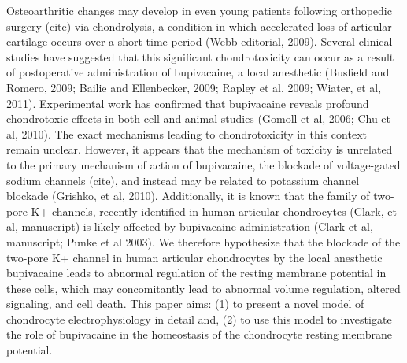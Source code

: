 {Osteoarthritic changes may develop in even young patients following
orthopedic surgery (cite) via chondrolysis, a condition in which
accelerated loss of articular cartilage occurs over a short time
period (Webb editorial, 2009).  Several clinical studies have
suggested that this significant chondrotoxicity can occur as a result
of postoperative administration of bupivacaine, a local anesthetic
(Busfield and Romero, 2009; Bailie and Ellenbecker, 2009; Rapley et
al, 2009; Wiater, et al, 2011).  Experimental work has confirmed that
bupivacaine reveals profound chondrotoxic effects in both cell
\citep{Chuetal2006} and animal studies (Gomoll et al, 2006; Chu et al,
2010).  The exact mechanisms leading to chondrotoxicity in this
context remain unclear.  However, it appears that the mechanism of
toxicity is unrelated to the primary mechanism of action of
bupivacaine, the blockade of voltage-gated sodium channels (cite), and
instead may be related to potassium channel blockade (Grishko, et al,
2010).  Additionally, it is known that the family of two-pore K+
channels, recently identified in human articular chondrocytes (Clark,
et al, manuscript) is likely affected by bupivacaine administration
(Clark et al, manuscript; Punke et al 2003).  We therefore hypothesize
that the blockade of the two-pore K+ channel in human articular
chondrocytes by the local anesthetic bupivacaine leads to abnormal
regulation of the resting membrane potential in these cells, which may
concomitantly lead to abnormal volume regulation, altered signaling,
and cell death.  This paper aims: (1) to present a novel
model of chondrocyte electrophysiology in detail and, (2) to use this
model to investigate the role of bupivacaine in the homeostasis of the
chondrocyte resting membrane potential.

}
